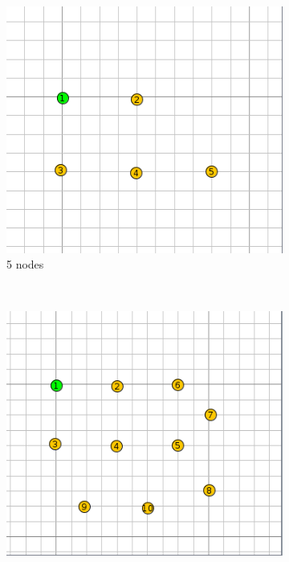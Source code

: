 \begin{figure}[h]
    \centering
    \begin{subfigure}[b]{0.45\textwidth}
        \includegraphics[width=\textwidth]{res/5_nodes}
        \caption{5 nodes}
    \end{subfigure}
    ~
    \begin{subfigure}[b]{0.45\textwidth}
        \includegraphics[width=\textwidth]{res/10_nodes}

\end{subfigure}
\end{figure}
